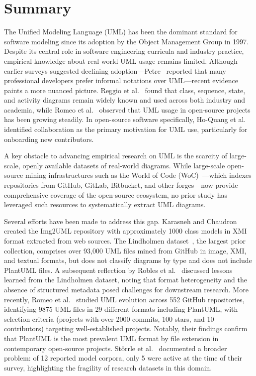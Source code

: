 \documentclass[data,datadescriptor,submit,pdftex,moreauthors]{Definitions/mdpi}
\begin{document}
\section{Summary}
\label{sec:summary}

The Unified Modeling Language (UML) has been the dominant standard for software modeling since its adoption by the Object Management Group in 1997. Despite its central role in software engineering curricula and industry practice, empirical knowledge about real-world UML usage remains limited. Although earlier surveys suggested declining adoption---Petre~\cite{petre2013uml} reported that many professional developers prefer informal notations over UML---recent evidence paints a more nuanced picture. Reggio et al.~\cite{reggio2014who} found that class, sequence, state, and activity diagrams remain widely known and used across both industry and academia, while Romeo et al.~\cite{romeo2025uml} observed that UML usage in open-source projects has been growing steadily. In open-source software specifically, Ho-Quang et al.~\cite{hoquang2017practices} identified collaboration as the primary motivation for UML use, particularly for onboarding new contributors.

A key obstacle to advancing empirical research on UML is the scarcity of large-scale, openly available datasets of real-world diagrams. While large-scale open-source mining infrastructures such as the World of Code (WoC)~\cite{ma2021world}---which indexes repositories from GitHub, GitLab, Bitbucket, and other forges---now provide comprehensive coverage of the open-source ecosystem, no prior study has leveraged such resources to systematically extract UML diagrams.

Several efforts have been made to address this gap. Karasneh and Chaudron~\cite{karasneh2013img2uml} created the Img2UML repository with approximately 1000 class models in XMI format extracted from web sources. The Lindholmen dataset~\cite{hebig2016quest,robles2017extensive}, the largest prior collection, comprises over 93,000 UML files mined from GitHub in image, XMI, and textual formats, but does not classify diagrams by type and does not include PlantUML files. A subsequent reflection by Robles et al.~\cite{robles2023reflection} discussed lessons learned from the Lindholmen dataset, noting that format heterogeneity and the absence of structured metadata posed challenges for downstream research. More recently, Romeo et al.~\cite{romeo2025uml} studied UML evolution across 552 GitHub repositories, identifying 9875 UML files in 29 different formats including PlantUML, with selection criteria (projects with over 2000 commits, 100 stars, and 10 contributors) targeting well-established projects. Notably, their findings confirm that PlantUML is the most prevalent UML format by file extension in contemporary open-source projects. St\"{o}rrle et al.~\cite{storrle2014index} documented a broader problem: of 12 reported model corpora, only 5 were active at the time of their survey, highlighting the fragility of research datasets in this domain.
\end{document}
